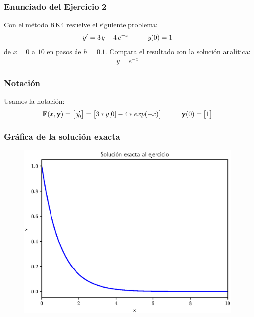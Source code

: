 \documentclass[12pt]{beamer}
\begin{document}
\begin{frame}
\frametitle{Enunciado del Ejercicio 2}
Con el método RK4 resuelve el siguiente problema:
\pause
\begin{align*}
{y}^{\prime} = 3 \, y - 4 \, e^{-x} \hspace{1cm} y (0) = 1
\end{align*}
de $x = 0$ a $10$ en pasos de $h = 0.1$. \pause Compara el resultado con la solución analítica:
\pause
\begin{align*}
y = e^{-x}
\end{align*}
\end{frame}
\begin{frame}
\frametitle{Notación}
Usamos la notación:
\pause
\begin{align*}
\mathbf{F} (x, \mathbf{y}) = 
\begin{bmatrix}
{y}^{\prime}_{0} 
\end{bmatrix} =
\begin{bmatrix}
3 * y[0] - 4 * exp(-x)
\end{bmatrix}
\hspace{1cm}
\mathbf{y} (0) = 
\begin{bmatrix}
1
\end{bmatrix}
\end{align*}
\end{frame}
\begin{frame}
\frametitle{Gráfica de la solución exacta}
\begin{figure}
	\centering
	\includegraphics[scale=0.55]{Imagenes/plot_rk4_ejercicio_02_02.eps}
\end{figure}
\end{frame}
\end{document}
